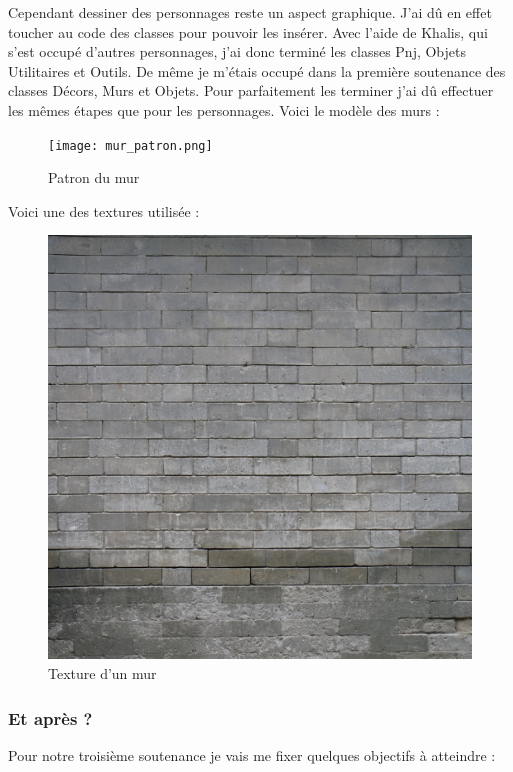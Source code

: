 \documentclass{article}
\begin{document}
\newpage

\par
Cependant dessiner des personnages reste un aspect graphique. J’ai dû en effet toucher au code des classes pour pouvoir les insérer. Avec l’aide de Khalis, qui s’est occupé d’autres personnages, j’ai donc terminé les classes Pnj, Objets Utilitaires et Outils.
De même je m’étais occupé dans la première soutenance des classes Décors, Murs et Objets. Pour parfaitement les terminer j’ai dû effectuer les mêmes étapes que pour les personnages.
\newpage
Voici le modèle des murs :
\begin{figure}[h]
\begin{center}
\texttt{[image: mur\_patron.png]}
\caption{Patron du mur}
\end{center}
\end{figure}

Voici une des textures utilisée :
\begin{figure}[h]
\begin{center}
\includegraphics[scale=0.35]{mur_brique.png}
\caption{Texture d'un mur}
\end{center}
\end{figure}

\newpage
\subsubsection{Et après ?}
\par
Pour notre troisième soutenance je vais me fixer quelques objectifs à atteindre :
\newline
\end{document}
